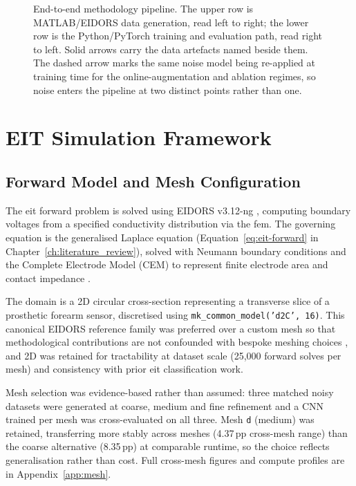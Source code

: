 \begin{figure}[htbp]
{%
}
\caption[End-to-end methodology pipeline]{End-to-end methodology pipeline. The upper row is MATLAB/EIDORS data generation, read left to right; the lower row is the Python/PyTorch training and evaluation path, read right to left. Solid arrows carry the data artefacts named beside them. The dashed arrow marks the same noise model being re-applied at training time for the online-augmentation and ablation regimes, so noise enters the pipeline at two distinct points rather than one.}
\label{fig:method-pipeline}
\end{figure}

\section{EIT Simulation Framework}
\label{sec:method-simulation}

\subsection{Forward Model and Mesh Configuration}
\label{sec:method-mesh}

The \gls{eit} forward problem is solved using EIDORS v3.12-ng \parencite{adler2006}, computing boundary voltages from a specified conductivity distribution via the \gls{fem}. The governing equation is the generalised Laplace equation (Equation~\ref{eq:eit-forward} in Chapter~\ref{ch:literature_review}), solved with Neumann boundary conditions and the Complete Electrode Model (CEM) to represent finite electrode area and contact impedance \parencite{cheney1999, somersalo1992}.

The domain is a 2D circular cross-section representing a transverse slice of a prosthetic forearm sensor, discretised using \texttt{mk\_common\_model('d2C', 16)}. This canonical EIDORS reference family was preferred over a custom mesh so that methodological contributions are not confounded with bespoke meshing choices \parencite{adler2006, adler2009}, and 2D was retained for tractability at dataset scale (25,000 forward solves per mesh) and consistency with prior \gls{eit} classification work.


Mesh selection was evidence-based rather than assumed: three matched noisy datasets were generated at coarse, medium and fine refinement and a CNN trained per mesh was cross-evaluated on all three. Mesh \texttt{d} (medium) was retained, transferring more stably across meshes (4.37\,pp cross-mesh range) than the coarse alternative (8.35\,pp) at comparable runtime, so the choice reflects generalisation rather than cost. Full cross-mesh figures and compute profiles are in Appendix~\ref{app:mesh}.

